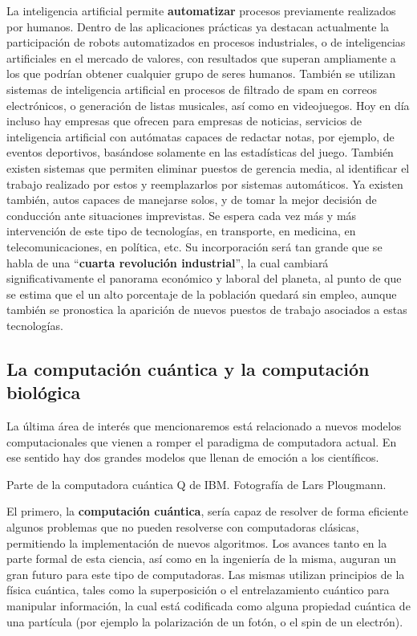 La inteligencia artificial permite \textbf{automatizar} procesos previamente
realizados por humanos. Dentro de las aplicaciones prácticas ya destacan
actualmente la participación de robots automatizados en procesos industriales,
o de inteligencias artificiales en el mercado de valores, con resultados que
superan ampliamente a los que podrían obtener cualquier grupo de seres humanos.
También se utilizan sistemas de inteligencia artificial en procesos de filtrado
de spam en correos electrónicos, o generación de listas musicales, así como en
videojuegos. Hoy en día incluso hay empresas que ofrecen para empresas de noticias,
servicios de inteligencia artificial con autómatas capaces de redactar notas, por
ejemplo, de eventos deportivos, basándose solamente en las estadísticas del juego.
También existen sistemas que permiten eliminar puestos de gerencia media, al
identificar el trabajo realizado por estos y reemplazarlos por sistemas automáticos.
Ya existen también, autos capaces de manejarse solos, y de tomar la mejor decisión
de conducción ante situaciones imprevistas.
Se espera cada vez más y más intervención de este tipo de tecnologías, en transporte,
en medicina, en telecomunicaciones, en política, etc. Su incorporación será tan
grande que se habla de una ``\textbf{cuarta revolución industrial}'', la cual
cambiará significativamente el panorama económico y laboral del planeta, al punto
de que se estima que el un alto porcentaje de la población quedará sin empleo,
aunque también se pronostica la aparición de nuevos puestos de trabajo asociados
a estas tecnologías.\autocite{wef_2016}


\subsection{La computación cuántica y la computación biológica}

La última área de interés que mencionaremos está relacionado a nuevos modelos
computacionales que vienen a romper el paradigma de computadora actual. En ese
sentido hay dos grandes modelos que llenan de emoción a los científicos.

{Parte de la computadora cuántica Q de IBM.}
{Fotografía de Lars Plougmann.}

El primero, la \textbf{computación cuántica}, sería capaz de resolver de forma
eficiente algunos problemas que no pueden resolverse con computadoras clásicas,
permitiendo la implementación de nuevos algoritmos. Los avances tanto en la parte
formal de esta ciencia, así como en la ingeniería de la misma, auguran un gran
futuro para este tipo de computadoras. Las mismas utilizan principios de la
física cuántica, tales como la superposición o el entrelazamiento cuántico para
manipular información, la cual está codificada como alguna propiedad cuántica
de una partícula (por ejemplo la polarización de un fotón, o el spin de un
electrón).\autocite{nielsen_2011}

